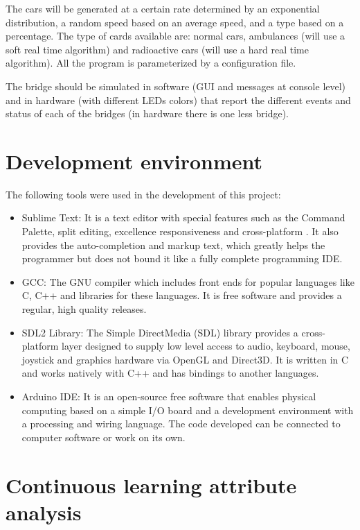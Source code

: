 \documentclass[a4paper,9pt]{article}
\begin{document}
The cars will be generated at a certain rate determined by an exponential distribution, a random speed based on an average speed, and a type based on a percentage. The type of cards available are: normal cars, ambulances (will use a soft real time algorithm) and radioactive cars (will use a hard real time algorithm). All the program is parameterized by a configuration file. 

The bridge should be simulated in software (GUI and messages at console level) and in hardware (with different LEDs colors) that report the different events and status of each of the bridges (in hardware there is one less bridge).

\section{Development environment}

The following tools were used in the development of this project:
\begin{itemize}
\item Sublime Text: It is a text editor with special features such as the Command Palette, split editing, excellence responsiveness and cross-platform \cite{sublime}. It also provides the auto-completion and markup text, which greatly helps the programmer but does not bound it like a fully complete programming IDE. 
\item GCC: The GNU compiler which includes front ends for popular languages like C, C++ and libraries for these languages. It is free software and provides a regular, high quality releases. \cite{gcc}
\item SDL2 Library: The Simple DirectMedia (SDL) library provides a cross-platform layer designed to supply low level access to audio, keyboard, mouse, joystick and graphics hardware via OpenGL and Direct3D. It is written in C and works natively with C++ and has bindings to another languages. \cite{SDL2}
\item Arduino IDE: It is an open-source free software that enables physical computing based on a simple I/O board and a development environment with a processing and wiring language. The code developed can be connected to computer software or work on its own. \cite{arduino}
\end{itemize}

\section{Continuous learning attribute analysis}
\end{document}
